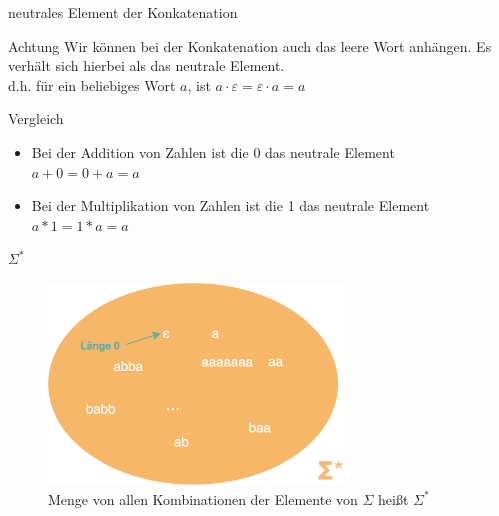 \documentclass[10pt]{beamer}
\newcommand{\emptyWord}{\varepsilon}
\begin{document}
\begin{frame}{neutrales Element der Konkatenation}
    \begin{alertblock}{Achtung}
        Wir können bei der Konkatenation auch das leere Wort anhängen. Es verhält sich hierbei als das neutrale Element.\\
        d.h. für ein beliebiges Wort $a$, ist $a\cdot\emptyWord = \emptyWord\cdot a=a$
        \begin{exampleblock}{Vergleich}
        \begin{itemize}
            \item Bei der Addition von Zahlen ist die 0 das neutrale Element\\
            $a+0=0+a=a$
            \item Bei der Multiplikation von Zahlen ist die 1 das neutrale Element\\
            $a*1=1*a=a$
        \end{itemize}
        
        \end{exampleblock}
    \end{alertblock}
\end{frame}


\begin{frame}[fragile]{$\Sigma^\ast$}
\begin{figure}
    \centering
    \includegraphics[width=0.7\textwidth]{figures/SigmaSternEpsilon.png}
    \caption{Menge von allen Kombinationen der Elemente von $\Sigma$ heißt $\Sigma^\ast$}
\end{figure}
\end{frame}
\end{document}
